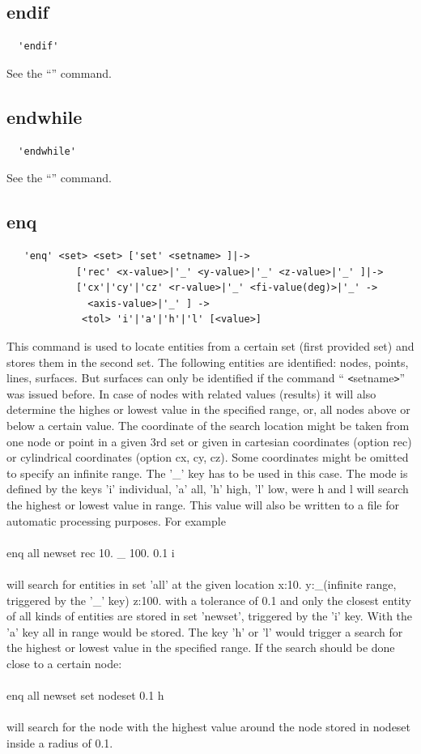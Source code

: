\documentclass{article}
\begin{document}
\subsection{\label{endif}endif}
\begin{verbatim}
  'endif'
\end{verbatim}
See the ``'' command.

\subsection{\label{endwhile}endwhile}
\begin{verbatim}
  'endwhile'
\end{verbatim}
See the ``'' command.

\subsection{\label{enq}enq}
\begin{verbatim}
   'enq' <set> <set> ['set' <setname> ]|->
            ['rec' <x-value>|'_' <y-value>|'_' <z-value>|'_' ]|->
            ['cx'|'cy'|'cz' <r-value>|'_' <fi-value(deg)>|'_' ->
              <axis-value>|'_' ] -> 
             <tol> 'i'|'a'|'h'|'l' [<value>]
\end{verbatim}
This command is used to locate entities from a certain set (first provided set) and stores them in the second set. The following entities are identified: nodes, points, lines, surfaces. But surfaces can only be identified if the command `` \verb_<_setname\verb_>_'' was issued before. In case of nodes with related values (results) it will also determine the highes or lowest value in the specified range, or, all nodes above or below a certain value. The coordinate of the search location might be taken from one node or point in a given 3rd set or given in cartesian coordinates (option rec) or cylindrical coordinates (option cx, cy, cz). Some coordinates might be omitted to specify an infinite range. The '\_' key has to be used in this case. The mode is defined by the keys 'i' individual, 'a' all, 'h' high, 'l' low, were h and l will search the highest or lowest value in range. This value will also be written to a file for automatic processing purposes. For example\\\\
enq all newset rec 10. \_ 100. 0.1 i\\\\
will search for entities in set 'all' at the given location x:10. y:\_(infinite range, triggered by the '\_' key) z:100. with a tolerance of 0.1 and only the closest entity of all kinds of entities are stored in set 'newset', triggered by the 'i' key. With the 'a' key all in range would be stored. The key 'h' or 'l' would trigger a search for the highest or lowest value in the specified range. If the search should be done close to a certain node: \\\\
enq all newset set nodeset 0.1 h\\\\
will search for the node with the highest value around the node stored in nodeset inside a radius of 0.1.
\end{document}
